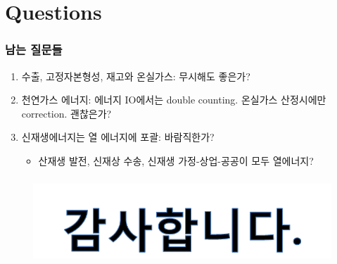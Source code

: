 \documentclass[10pt,compress,slidetop,%
			   hyperref={unicode},xcolor={svgnames},%
			   t]{beamer}
\begin{document}
\section{Questions}

\begin{frame}
\frametitle{남는 질문들}
\bigskip
\begin{enumerate}
\item{수출, 고정자본형성, 재고와 온실가스: 무시해도 좋은가?}
\bigskip
\item{천연가스 에너지: 에너지 IO에서는 double counting. 온실가스 산정시에만 correction. 괜찮은가?}
\bigskip
\item{신재생에너지는 열 에너지에 포괄: 바람직한가?}
\begin{itemize}
\item{산재생 발전, 신재상 수송, 신재생 가정-상업-공공이 모두 열에너지?}
\end{itemize}
\end{enumerate}
\end{frame}
%
\begin{frame}
	\frametitle{}
	  	\begin{figure}
	\centering
	 \includegraphics[width=1.00\textwidth]{thanks.png}
	\end{figure}	
	
\end{frame}
\end{document}
